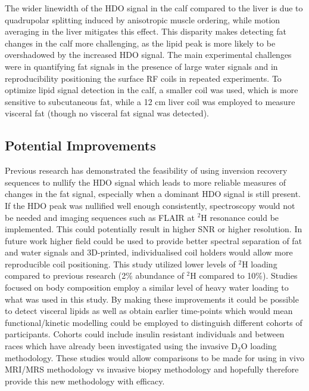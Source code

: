 \documentclass[class=article, crop=false]{standalone}
\begin{document}
The wider linewidth of the HDO signal in the calf compared to the liver is due to quadrupolar splitting induced by anisotropic muscle ordering\cite{Gursan2022ResidualMuscle}, while motion averaging in the liver mitigates this effect. This disparity makes detecting fat changes in the calf more challenging, as the lipid peak is more likely to be overshadowed by the increased HDO signal. The main experimental challenges were in quantifying fat signals in the presence of large water signals and in reproducibility positioning the surface RF coils in repeated experiments. To optimize lipid signal detection in the calf, a smaller coil was used, which is more sensitive to subcutaneous fat, while a 12 cm liver coil was employed to measure visceral fat (though no visceral fat signal was detected). 

\subsection{Potential Improvements}

Previous research has demonstrated the feasibility of using inversion recovery sequences to nullify the HDO signal which leads to more reliable measures of changes in the fat signal\cite{Brereton1989TheMice}, especially when a dominant HDO signal is still present. If the HDO peak was nullified well enough consistently, spectroscopy would not be needed and imaging sequences such as FLAIR at $^2$H resonance could be implemented. This could potentially result in higher SNR or higher resolution. In future work higher field could be used to provide better spectral separation of fat and water signals and 3D-printed, individualised coil holders would allow more reproducible coil positioning. This study utilized lower levels of $^2$H loading compared to previous research (2\% abundance of $^2$H compared to 10\%). Studies focused on body composition employ a similar level of heavy water loading to what was used in this study. By making these improvements it could be possible to detect visceral lipids as well as obtain earlier time-points which would mean functional/kinetic modelling could be employed to distinguish different cohorts of participants. Cohorts could include insulin resistant individuals\cite{White2017AssociationHumans} and between races\cite{White2018RacialHumans} which have already been investigated using the invasive D$_2$O loading methodology. These studies would allow comparisons to be made for using in vivo MRI/MRS methodology vs invasive biopsy methodology and hopefully therefore provide this new methodology with efficacy.
\end{document}
